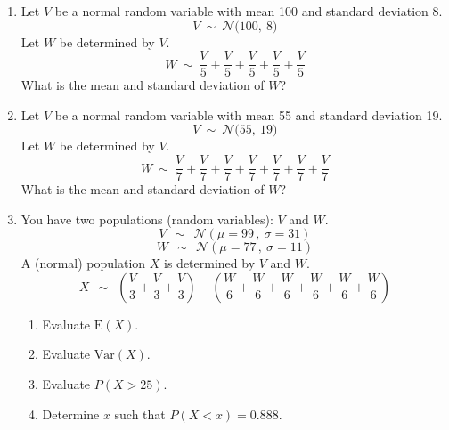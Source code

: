 \documentclass[12pt,letterpaper]{article}
\newcommand{\N}[2]{\mathcal{N}\big(#1,~#2\big)}
\begin{document}
\begin{enumerate}[resume]
\item Let $V$ be a normal random variable with mean 100 and standard deviation 8.
$$V ~\sim~ \N{100}{8} $$
Let $W$ be determined by $V$.
$$W ~\sim~ \frac{V}{5}+\frac{V}{5}+\frac{V}{5}+\frac{V}{5}+\frac{V}{5} $$
What is the mean and standard deviation of $W$?
\vfill

\item Let $V$ be a normal random variable with mean 55 and standard deviation 19.
$$V ~\sim~ \N{55}{19} $$
Let $W$ be determined by $V$.
$$W ~\sim~ \frac{V}{7}+\frac{V}{7}+\frac{V}{7}+\frac{V}{7}+\frac{V}{7}+\frac{V}{7}+\frac{V}{7} $$
What is the mean and standard deviation of $W$?
\vfill

\newpage

\item You have two populations (random variables): $V$ and $W$.
$$V ~~\sim~~ \mathcal{N}\left(\mu=99\,,~\sigma=31 \right)$$ 
$$W ~~\sim~~ \mathcal{N}\left(\mu=77\,,~\sigma=11 \right)$$ 
A (normal) population $X$ is determined by $V$ and $W$.
$$X ~~\sim~~ \left(\frac{V}{3}+\frac{V}{3}+\frac{V}{3}\right)-\left(\frac{W}{6}+\frac{W}{6}+\frac{W}{6}+\frac{W}{6}+\frac{W}{6}+\frac{W}{6}\right)$$ 
\begin{enumerate}
\item Evaluate $\text{E}(X)$.
\item Evaluate $\text{Var}(X)$.
\item Evaluate $P(X>25)$.
\item Determine $x$ such that $P(X<x) = 0.888$.
\end{enumerate}



\end{enumerate}
\end{document}
